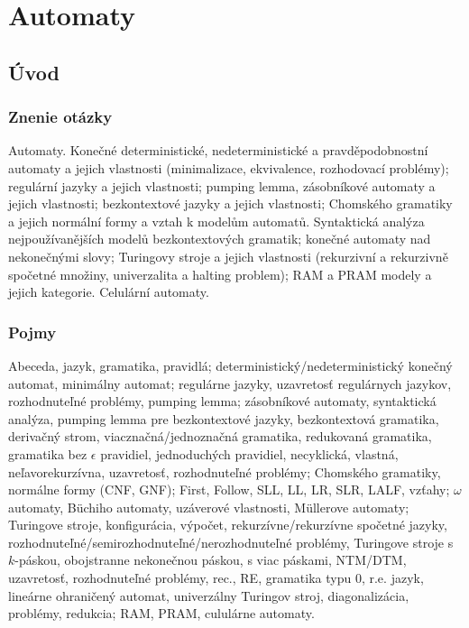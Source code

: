 \section{Automaty}

\subsection{Úvod}
\subsubsection*{Znenie otázky}
Automaty. Konečné deterministické, nedeterministické a pravděpodobnostní 
automaty a jejich vlastnosti (minimalizace, ekvivalence, rozhodovací problémy); 
regulární jazyky a jejich vlastnosti; pumping lemma, zásobníkové 
automaty a jejich vlastnosti; bezkontextové jazyky a jejich vlastnosti; 
Chomského gramatiky a jejich normální formy a vztah k modelům automatů. 
Syntaktická analýza nejpoužívanějších modelů bezkontextových gramatik; 
konečné automaty nad nekonečnými slovy; Turingovy stroje a jejich vlastnosti 
(rekurzivní a rekurzivně spočetné množiny, univerzalita a halting problem); 
RAM a PRAM modely a jejich kategorie. Celulární automaty.

\subsubsection*{Pojmy}
Abeceda, jazyk, gramatika, pravidlá; deterministický/nedeterministický konečný automat, 
minimálny automat; regulárne jazyky, uzavretosť regulárnych jazykov, rozhodnuteľné
problémy, pumping lemma; zásobníkové automaty, syntaktická analýza, pumping lemma
pre bezkontextové jazyky, bezkontextová gramatika, derivačný strom,
viacznačná/jednoznačná gramatika, redukovaná gramatika, gramatika
bez $\epsilon$ pravidiel, jednoduchých pravidiel, necyklická, vlastná,
neľavorekurzívna, uzavretosť, rozhodnuteľné problémy;
Chomského gramatiky, normálne formy (CNF, GNF);
First, Follow, SLL, LL, LR, SLR, LALF, vzťahy;
$\omega$ automaty, Büchiho automaty, uzáverové vlastnosti, 
Müllerove automaty; Turingove stroje, konfigurácia, výpočet,
rekurzívne/rekurzívne spočetné jazyky, rozhodnuteľné/semirozhodnuteľné/nerozhodnuteľné problémy,
Turingove stroje s $k$-páskou, obojstranne nekonečnou páskou, 
s viac páskami, NTM/DTM, uzavretosť, rozhodnuteľné problémy,
rec., RE, gramatika typu $0$, r.e. jazyk, lineárne ohraničený automat,
univerzálny Turingov stroj, diagonalizácia, problémy, redukcia;
RAM, PRAM, cululárne automaty.


